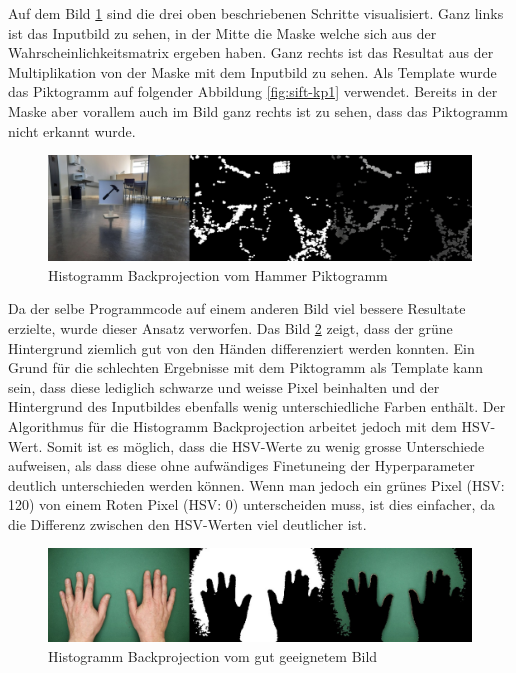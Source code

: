 Auf dem Bild \ref{fig:backprojection-hammer} sind die drei oben beschriebenen Schritte visualisiert. Ganz links ist das Inputbild zu sehen, in der Mitte die Maske welche sich aus der Wahrscheinlichkeitsmatrix ergeben haben. Ganz rechts ist das Resultat aus der Multiplikation von der Maske mit dem Inputbild zu sehen. Als Template wurde das Piktogramm auf folgender Abbildung \ref{fig:sift-kp1} verwendet. Bereits in der Maske aber vorallem auch im Bild ganz rechts ist zu sehen, dass das Piktogramm nicht erkannt wurde. 

\begin{figure}[H]
  \includegraphics[width=1\textwidth]{img/piktogrammerkennung/hammer_backprojection.jpg}
  \centering
  \caption{Histogramm Backprojection vom Hammer Piktogramm}
  \label{fig:backprojection-hammer}
\end{figure}

Da der selbe Programmcode auf einem anderen Bild viel bessere Resultate erzielte, wurde dieser Ansatz verworfen. Das Bild \ref{fig:backprojection-hand} zeigt, dass der grüne Hintergrund ziemlich gut von den Händen differenziert werden konnten. Ein Grund für die schlechten Ergebnisse mit dem Piktogramm als Template kann sein, dass diese lediglich schwarze und weisse Pixel beinhalten und der Hintergrund des Inputbildes ebenfalls wenig unterschiedliche Farben enthält. Der Algorithmus für die Histogramm Backprojection arbeitet jedoch mit dem HSV-Wert. Somit ist es möglich, dass die HSV-Werte zu wenig grosse Unterschiede aufweisen, als dass diese ohne aufwändiges Finetuneing der Hyperparameter deutlich unterschieden werden können. Wenn man jedoch ein grünes Pixel (HSV: 120) von einem Roten Pixel (HSV: 0) unterscheiden muss, ist dies einfacher, da die Differenz zwischen den HSV-Werten viel deutlicher ist. 

\begin{figure}[H]
  \includegraphics[width=1\textwidth]{img/piktogrammerkennung/hand_backprojection.jpg}
  \centering
  \caption{Histogramm Backprojection vom gut geeignetem Bild}
  \label{fig:backprojection-hand}
\end{figure}


